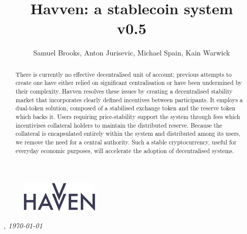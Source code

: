 \documentclass{article}
\theoremstyle{definition}
\theoremstyle{plain} %
\begin{document}
\newcommand{\HAV}{\textsc{hav}}
\newcommand{\NOM}{\textsc{nom}}


\title{Havven: a stablecoin system\\ v0.5}
\author{Samuel Brooks, Anton Jurisevic, Michael Spain, Kain Warwick}
\date{}

\begin{figure}
    \centering
    \includegraphics[width=0.33\textwidth]{img/havvenlogo}
\end{figure}
\maketitle

\hfill

\begin{abstract}
\noindent There is currently no effective decentralised unit of account; previous attempts to create one have either relied on significant centralisation or have been undermined by their complexity. Havven resolves these issues by creating a decentralised stability market that incorporates clearly defined incentives between participants. It employs a dual-token solution, composed of a stabilised exchange token and the reserve token which backs it. Users requiring price-stability support the system through fees which incentivises collateral holders to maintain the distributed reserve. Because the collateral is encapsulated entirely within the system and distributed among its users, we remove the need for a central authority. Such a stable cryptocurrency, useful for everyday economic purposes, will accelerate the adoption of decentralised systems.

\end{abstract}	
\vspace{20mm}
\begin{center}
  \small{\textit{\currenttime , \today}}
\end{center}


\pagebreak 

\tableofcontents


\pagebreak


%



%
%

%
%
\end{document}
